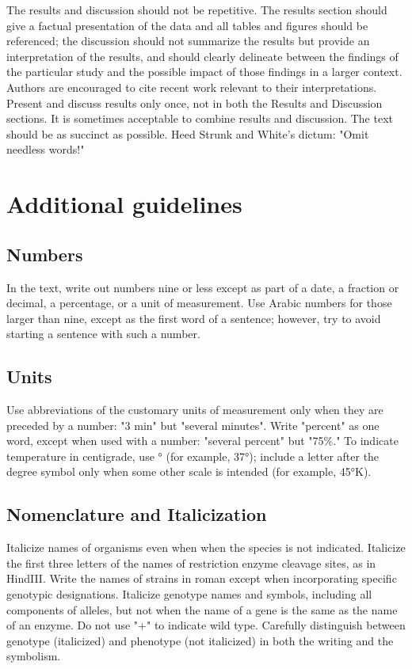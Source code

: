 \documentclass[9pt,twocolumn,twoside]{g3_article/gsag3jnl}
\begin{document}
The results and discussion should not be repetitive. The results section should give a factual 
presentation of the data and all tables and figures should be referenced; the discussion 
should not summarize the results but provide an interpretation of the results, and should 
clearly delineate between the findings of the particular study and the possible impact 
of those findings in a larger context. Authors are encouraged to cite recent work 
relevant to their interpretations. Present and discuss results only once, not in 
both the Results and Discussion sections. It is sometimes acceptable to combine 
results and discussion. The text should be as succinct as possible. 
Heed Strunk and White's dictum: "Omit needless words!"

\section*{Additional guidelines}

    \subsection*{Numbers} In the text, write out numbers nine or less except as part of a date, a fraction or decimal, 
                          a percentage, or a unit of measurement. Use Arabic numbers for those larger than nine, 
                          except as the first word of a sentence; however, try to avoid starting a sentence with such a number.

    \subsection*{Units} Use abbreviations of the customary units of measurement only when they are preceded by a number: 
            "3 min" but "several minutes". Write "percent" as one word, except when used with a number: 
            "several percent" but "75\%." To indicate temperature in centigrade, use ° 
            (for example, 37°); include a letter after the degree symbol only when some 
            other scale is intended (for example, 45°K).

    \subsection*{Nomenclature and Italicization} Italicize names of organisms even when  when the species is 
        not indicated.  Italicize the first three letters of the names of restriction enzyme cleavage 
        sites, as in HindIII. Write the names of strains in roman except when incorporating 
        specific genotypic designations. Italicize genotype names and symbols, including all components 
        of alleles, but not when the name of a gene is the same as the name of 
        an enzyme. Do not use "+" to indicate wild type. Carefully distinguish between genotype 
        (italicized) and phenotype (not italicized) in both the writing and the symbolism.
\end{document}
